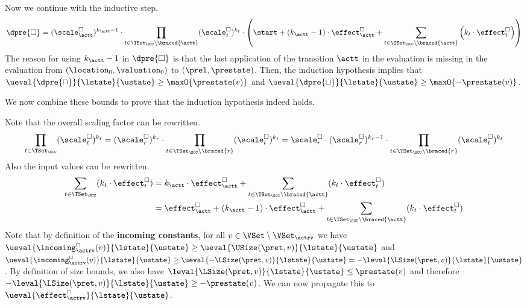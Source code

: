 Now we continue with the inductive step.
\begin{equation} \label{eq:induction_consequence}
  \dpre{\square} = (\scale^\square_\actt)^{k_\actt - 1} \cdot \prod_{t \in \TSet_\SCC \setminus \braced{\actt}} (\scale^\square_t)^{k_t} \cdot \left( \start + \left( k_\actt - 1 \right) \cdot \effect^\square_\actt + \sum_{t \in \TSet_\SCC \setminus \braced{\actt}} \left( k_t \cdot \effect^\square_t \right) \right)
\end{equation}
The reason for using $k_\actt - 1$ in $\dpre{\square}$ is that the last application of the transition $\actt$ in the evaluation is missing in the evaluation from $(\location_0, \valuation_0)$ to $(\prel, \prestate)$.
Then, the induction hypothesis implies that $\ueval{\dpre{\sqcap}}{\lstate}{\ustate} \geq \maxO{\prestate(v)}$ and $\ueval{\dpre{\sqcup}}{\lstate}{\ustate} \geq \maxO{-\prestate(v)}$.

We now combine these bounds to prove that the induction hypothesis indeed holds.

Note that the overall scaling factor can be rewritten.
\begin{equation} \label{eq:scaling_factor_reduction}
  \prod_{t \in \TSet_\SCC} (\scale^\square_t)^{k_t} = (\scale^\square_r)^{k_r} \cdot \prod_{t \in \TSet_\SCC \setminus \braced{r}} (\scale^\square_t)^{k_t} = \scale^\square_r \cdot (\scale^\square_r)^{k_r - 1} \cdot \prod_{t \in \TSet_\SCC \setminus \braced{r}} (\scale^\square_t)^{k_t}
\end{equation}
Also the input values can be rewritten.
\begin{equation} \label{eq:input_reduction}
  \begin{split}
  \sum_{t \in \TSet_\SCC} (k_t \cdot \effect^\square_t)
  & = k_\actt \cdot \effect^\square_\actt + \sum_{t \in \TSet_\SCC \setminus \braced{\actt}} (k_t \cdot \effect^\square_t) \\
  & = \effect^\square_\actt
    + (k_\actt - 1) \cdot \effect^\square_\actt
    + \sum_{t \in \TSet_\SCC \setminus \braced{\actt}} (k_t \cdot \effect^\square_t)
  \end{split}
\end{equation}
Note that by definition of the \textbf{incoming constants}, for all $v \in \VSet \setminus \VSet_\actrv$ we have $\ueval{\incoming^\sqcap_\actrv(v)}{\lstate}{\ustate} \geq \ueval{\USize(\pret, v)}{\lstate}{\ustate}$ and $\ueval{\incoming^\sqcup_\actrv(v)}{\lstate}{\ustate} \geq \ueval{-\LSize(\pret, v)}{\lstate}{\ustate} = -\leval{\LSize(\pret, v)}{\lstate}{\ustate}$.
By definition of size bounds, we also have $\leval{\LSize(\pret, v)}{\lstate}{\ustate} \leq \prestate(v)$ and therefore $-\leval{\LSize(\pret, v)}{\lstate}{\ustate} \geq -\prestate(v)$.
We can now propagate this to $\ueval{\effect^\sqcap_\actrv}{\lstate}{\ustate}$.

